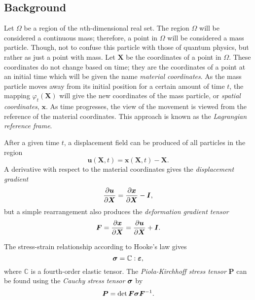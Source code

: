 \subsection{Background}
Let $\Omega$ be a region of the $n$th-dimensional real set. The region $\Omega$ will be considered a continuous mass; therefore, a point in $\Omega$ will be considered a mass particle. Though, not to confuse this particle with those of quantum physics, but rather as just a point with mass. Let $\bm{X}$ be the coordinates of a point in $\Omega$. These coordinates do not change based on time; they are the coordinates of a point at an initial time which will be given the name \textit{material coordinates}. As the mass particle moves away from its initial position for a certain amount of time $t$, the mapping $\varphi_t(\bm{X})$ will give the new coordinates of the mass particle, or \textit{spatial coordinates}, $\bm{x}$. As time progresses, the view of the movement is viewed from the reference of the material coordinates. This approach is known as the \textit{Lagrangian reference frame}.

After a given time $t$, a displacement field can be produced of all particles in the region
\begin{equation}
  \bm{u}(\bm{X},t) = \bm{x}(\bm{X},t) - \bm{X}.
\end{equation}
A derivative with respect to the material coordinates gives the \textit{displacement gradient}
\begin{equation}
  \frac{\partial\bm{u}}{\partial\bm{X}} = \frac{\partial\bm{x}}{\partial\bm{X}} - \bm{I},
\end{equation}
but a simple rearrangement also produces the \textit{deformation gradient tensor}
\begin{equation}
  \bm{F} = \frac{\partial\bm{x}}{\partial\bm{X}} = \frac{\partial\bm{u}}{\partial\bm{X}} + \bm{I}.
\end{equation}

The stress-strain relationship according to Hooke's law gives
\begin{equation}
  \label{eq::Hookes_Law}
  \bm{\sigma} = \mathbb{C}:\bm{\varepsilon},
\end{equation}
where $\mathbb{C}$ is a fourth-order elastic tensor. The \textit{Piola-Kirchhoff stress tensor} $\bm{P}$ can be found using the \textit{Cauchy stress tensor} $\bm{\sigma}$ by
\begin{equation}
  \bm{P} = \det{\bm{F}}\bm{\sigma}\bm{F}^{-1}.
\end{equation}
